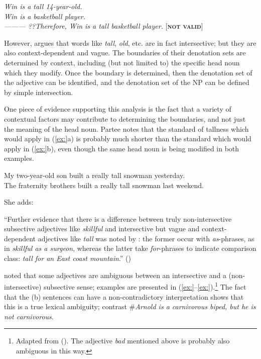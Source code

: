 \ea
\textit{Win is a tall 14-year-old.}\\
\textit{Win is a basketball player.\\
———\FelixHRule
??Therefore, Win is a tall basketball player.}   [\textbf{\textsc{not valid}}]
\z


However, \citet{Siegel1976} argues that words like \textit{tall}, \textit{old}, etc. are in fact intersective; but they are also context-dependent and vague. The boundaries of their denotation sets are determined by context, including (but not limited to) the specific head noun which they modify. Once the boundary is determined, then the denotation set of the adjective can be identified, and the denotation set of the NP can be defined by simple intersection.



One piece of evidence supporting this analysis is the fact that a variety of contextual factors may contribute to determining the boundaries, and not just the meaning of the head noun. Partee notes that the standard of tallness which would apply in (\ref{ex:}a) is probably much shorter than the standard which would apply in (\ref{ex:}b), even though the same head noun is being modified in both examples.


\ea
\ea My two-year-old son built a really tall snowman yesterday.\\
\ex The fraternity brothers built a really tall snowman last weekend.
                       \z
\z


She adds:


“Further evidence that there is a difference between truly non-intersective subsective adjectives like \textit{skillful} and intersective but vague and context-dependent adjectives like \textit{tall} was noted by \citet{Siegel1976}: the former occur with \textit{as}-phrases, as in \textit{skillful as a surgeon}, whereas the latter take \textit{for}-phrases to indicate comparison class: \textit{tall for an East coast mountain}.” (\citealt{Partee2007})


\citet{Bolinger1967} noted that some adjectives are ambiguous between an intersective and a (non-intersective) subsective sense; examples are presented in (\ref{ex:}--\ref{ex:}).\footnote{Adapted from \citealt{Morzycki2013} (). The adjective \textit{bad} mentioned above is probably also ambiguous in this way.} The fact that the (b) sentences can have a non-contradictory interpretation shows that this is a true lexical ambiguity; contrast \#\textit{Arnold is a carnivorous biped, but he is not carnivorous}.


